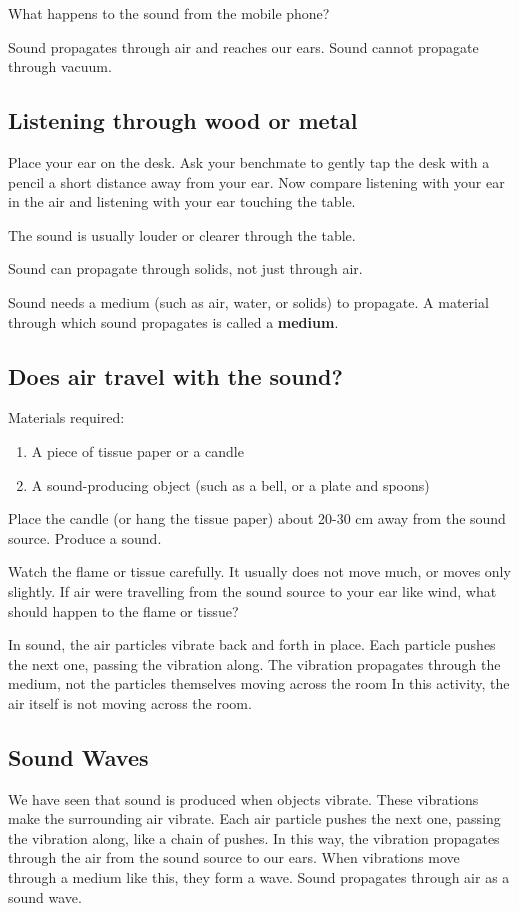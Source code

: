 \documentclass[12pt,a4paper]{tufte-handout}
\begin{document}
 What happens to the sound from the mobile phone?

 Sound propagates through air and reaches our ears. Sound cannot propagate through vacuum.

\subsection{Listening through wood or metal}

Place your ear on the desk. Ask your benchmate to gently tap the desk with a pencil a short distance away from your ear. Now compare listening with your ear in the air and listening with your ear touching the table.

 The sound is usually louder or clearer through the table.

 Sound can propagate through solids, not just through air.

Sound needs a medium (such as air, water, or solids) to propagate. A material through which sound propagates is called a \textbf{medium}.

\subsection{Does air travel with the sound?}

Materials required:
\begin{enumerate}
    \item A piece of tissue paper or a candle
    \item A sound-producing object (such as a bell, or a plate and spoons)
\end{enumerate}

Place the candle (or hang the tissue paper) about 20-30 cm away from the sound source. Produce a sound.

 Watch the flame or tissue carefully. It usually does not move much, or moves only slightly. If air were travelling from the sound source to your ear like wind, what should happen to the flame or tissue?

 In sound, the air particles vibrate back and forth in place. Each particle pushes the next one, passing the vibration along. The vibration propagates through the medium, not the particles themselves moving across the room In this activity, the air itself is not moving across the room.

\subsection{Sound Waves}
We have seen that sound is produced when objects vibrate. These vibrations make the surrounding air vibrate. Each air particle pushes the next one, passing the vibration along, like a chain of pushes. In this way, the vibration propagates through the air from the sound source to our ears. When vibrations move through a medium like this, they form a wave. Sound propagates through air as a sound wave.
\end{document}
